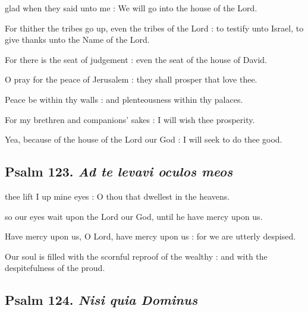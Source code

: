  glad when they said unto me : We will go into the house of the Lord.\par
{}
For thither the tribes go up, even the tribes of the Lord : to testify unto Israel, to give thanks unto the Name of the Lord.\par
{}For there is the seat of judgement : even the seat of the house of David.\par
{}O pray for the peace of Jerusalem : they shall prosper that love thee.\par
{}Peace be within thy walls : and plenteousness within thy palaces.\par
{}For my brethren and companions' sakes : I will wish thee prosperity.\par
{}Yea, because of the house of the Lord our God : I will seek to do thee good.\par

\subsection{Psalm 123. \textit{Ad te levavi oculos meos}}

 thee lift I up mine eyes : O thou that dwellest in the heavens.\par
\noindent
so our eyes wait upon the Lord our God, until he have mercy upon us.\par
{}Have mercy upon us, O Lord, have mercy upon us : for we are utterly despised.\par
{}Our soul is filled with the scornful reproof of the wealthy : and with the despitefulness of the proud.\par

\subsection{Psalm 124. \textit{Nisi quia Dominus}}

